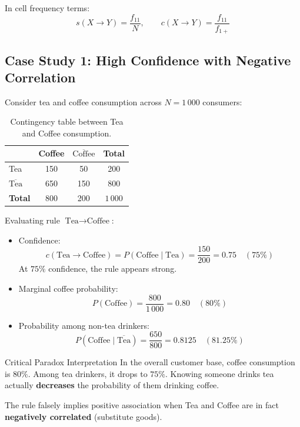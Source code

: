 In cell frequency terms:
\begin{equation}
s(X \longrightarrow Y) = \frac{f_{11}}{N}, \qquad c(X \longrightarrow Y) = \frac{f_{11}}{f_{1+}}
\end{equation}

\subsection{Case Study 1: High Confidence with Negative Correlation}
Consider tea and coffee consumption across $N = 1\,000$ consumers:

\begin{table}[htbp]
\centering
\small
\renewcommand{\arraystretch}{1.2}
\begin{tabular}{l c c c}
\toprule
& Coffee & $\overline{\text{Coffee}}$ & \textbf{Total} \\
\midrule
Tea & 150 & 50 & 200 \\
$\overline{\text{Tea}}$ & 650 & 150 & 800 \\
\midrule
\textbf{Total} & 800 & 200 & $1\,000$ \\
\bottomrule
\end{tabular}
\caption{Contingency table between Tea and Coffee consumption.}
\label{tab:dm-tea-coffee-paradox-en}
\end{table}

Evaluating rule $\text{Tea} \longrightarrow \text{Coffee}$:
\begin{itemize}
    \item Confidence:
    \begin{equation}
    c(\text{Tea} \longrightarrow \text{Coffee}) = P(\text{Coffee} \mid \text{Tea}) = \frac{150}{200} = 0.75 \quad (75\%)
    \end{equation}
    At $75\%$ confidence, the rule appears strong.
    \item Marginal coffee probability:
    \begin{equation}
    P(\text{Coffee}) = \frac{800}{1\,000} = 0.80 \quad (80\%)
    \end{equation}
    \item Probability among non-tea drinkers:
    \begin{equation}
    P(\text{Coffee} \mid \overline{\text{Tea}}) = \frac{650}{800} = 0.8125 \quad (81.25\%)
    \end{equation}
\end{itemize}

\begin{noteblock}{Critical Paradox Interpretation}
    In the overall customer base, coffee consumption is $80\%$. Among tea drinkers, it drops to $75\%$. Knowing someone drinks tea actually \textbf{decreases} the probability of them drinking coffee.
    
    The rule falsely implies positive association when Tea and Coffee are in fact \textbf{negatively correlated} (substitute goods).
\end{noteblock}

